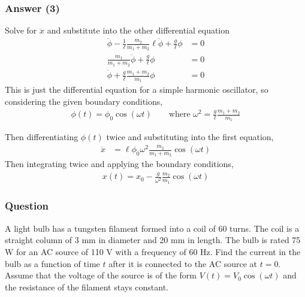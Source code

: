\subsubsection{Answer (3)}
Solve for $\ddot x$ and substitute into the other differential equation
\begin{align}
	\ddot \phi  - \frac{1}{\ell }\frac{m_2}{m_1+m_2} \ell  \ddot \phi  + \frac{g}{\ell }\phi  &= 0\nonumber
	\\
	\frac{m_1}{m_1+m_2} \ddot \phi  + \frac{g}{\ell }\phi  &= 0\nonumber
	\\
	\ddot \phi  + \frac{g}{\ell }\frac{m_1+m_2}{m_1} \phi  &= 0
\end{align}
This is just the differential equation for a simple harmonic oscillator, so
considering the given boundary conditions,
\begin{align}
	\boxed{
	\phi (t) = \phi _0\cos({\omega} t)
		\quad\quad\text{where } {\omega}^2 = \frac{g}{\ell }\frac{m_1+m_2}{m_1}
	}
\end{align}

Then differentiating $\phi (t)$ twice and substituting into the first equation,
\begin{align*}
	\ddot x &= \ell \phi _0{\omega}^2\frac{m_2}{m_1+m_2}\cos({\omega} t)
\end{align*}
Then integrating twice and applying the boundary conditions,
\begin{align}
	\boxed{
	x(t) = x_0 - \frac{g}{{\omega}^2}\frac{m_2}{m_1}\cos({\omega} t)
	}
\end{align}

\subsubsection{Question}
A light bulb has a tungsten filament formed into a coil of 60 turns. The coil is a straight column of 3 mm in diameter and 20 mm in length. The bulb is rated 75 W for an AC source of 110 V with a frequency of 60 Hz. Find the current in the bulb as a function of time $t$ after it is connected to the AC source at $t = 0$. Assume that the voltage of the source is of the form $V(t) = V_0 \cos(\omega t)$ and the resistance of the filament stays constant.
